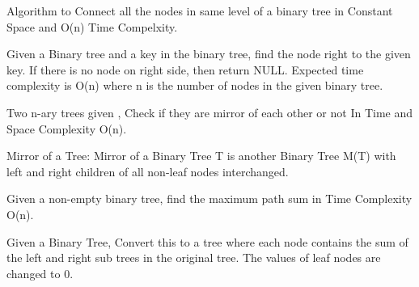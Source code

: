 {\begin{exercise}
\begin{compactenum}
    \item Algorithm to Connect all the nodes in same level of a binary tree in Constant Space and O(n) Time Compelxity.
    \item Given a Binary tree and a key in the binary tree, find the node right to the given key. If there is no node on right side, then return NULL. Expected time complexity is O(n) where n is the number of nodes in the given binary tree.
    \item Two n-ary trees given , Check if they are mirror of each other or not In Time and Space Complexity O(n).
    \item Mirror of a Tree: Mirror of a Binary Tree T is another Binary Tree M(T) with left and right children of all non-leaf nodes interchanged.
    \item Given a non-empty binary tree, find the maximum path sum in Time Complexity O(n).
    \item Given a Binary Tree, Convert this to a tree where each node contains the sum of the left and right sub trees in the original tree. The values of leaf nodes are changed to 0.
    \item 
    


\end{compactenum}


\end{exercise}}
